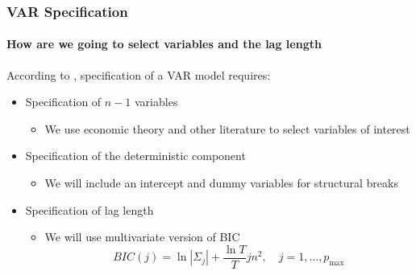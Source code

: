 \begin{frame}
    \frametitle{VAR Specification}
    \framesubtitle{How are we going to select variables and the lag length}

    According to \cite[256]{ghysels_2018_applied}, specification of a VAR model requires:
    \begin{itemize}
        \item Specification of $n-1$ variables
              \begin{itemize}
                  \item We use economic theory and other literature to select variables of interest
              \end{itemize}
        \item Specification of the deterministic component
              \begin{itemize}
                  \item We will include an intercept and dummy variables for structural breaks
              \end{itemize}
        \item Specification of lag length
              \begin{itemize}
                  \item We will use multivariate version of BIC
                        $$ B I C(j)=\ln \left|\Sigma_j\right|+\frac{\ln T}{T} j n^2, \quad j=1, \ldots, p_{\max }$$
              \end{itemize}
    \end{itemize}

\end{frame}